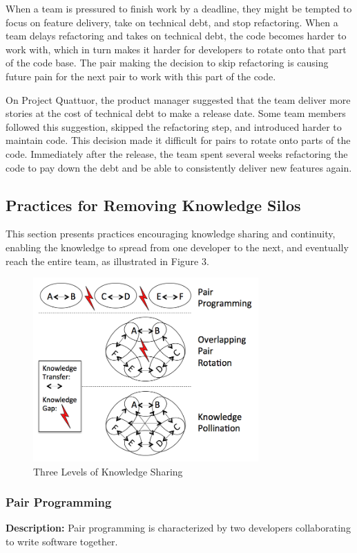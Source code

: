 \begin{table}[]
When a team is pressured to finish work by a deadline, they might be tempted to focus on feature delivery, take on technical debt, and stop refactoring. When a team delays refactoring and takes on technical debt, the code becomes harder to work with, which in turn makes it harder for developers to rotate onto that part of the code base. The pair making the decision to skip refactoring is causing future pain for the next pair to work with this part of the code. 

On Project Quattuor, the product manager suggested that the team deliver more stories at the cost of technical debt to make a release date. Some team members followed this suggestion, skipped the refactoring step, and introduced harder to maintain code. This decision made it difficult for pairs to rotate onto parts of the code. Immediately after the release, the team spent several weeks refactoring the code to pay down the debt and be able to consistently deliver new features again.  
\subsection{Practices for Removing Knowledge Silos}
This section presents practices encouraging knowledge sharing and continuity, enabling the knowledge to spread from one developer to the next, and eventually reach the entire team, as illustrated in Figure 3.

\begin{figure}[t]
\centering
\includegraphics[width=3.4in]{KnowledgeSharingLevels.png}
\caption{Three Levels of Knowledge Sharing}
\label{KnowledgeSharing}
\end{figure}

\subsubsection{Pair Programming}
\textbf{Description:} Pair programming is characterized by two developers collaborating to write software together. 


\end{table}
